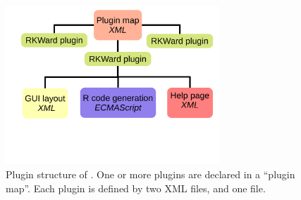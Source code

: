 \begin{figure}[b!]
 \centering
 \includegraphics[width=8cm]{../figures/plugin_structure.pdf}
 \caption{Plugin structure of . One or more plugins are declared in a ``plugin map''. Each plugin is defined by
 two XML files, and one  file.}
 \label{fig:plugin_structure}
\end{figure}


